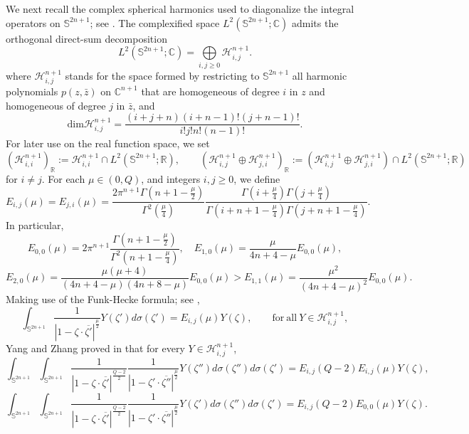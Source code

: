 \documentclass[10pt,a4paper]{amsart}
\begin{document}
{We next recall the complex spherical harmonics used to diagonalize the integral operators on}
$\mathbb{S}^{2n+1}$; see \cite[Section 5.2]{FL12}. {The complexified space $L^2(\mathbb{S}^{2n+1};\mathbb C)$
 admits the orthogonal direct-sum decomposition}
\begin{equation*}
 {L^2(\mathbb{S}^{2n+1};\mathbb C)=\bigoplus\limits_{i,j\geq0}\mathcal{H}_{i,j}^{n+1}.}
\end{equation*}
where $\mathcal{H}_{i,j}^{n+1}$ stands for the space formed by restricting to $\mathbb{S}^{2n+1}$ all harmonic polynomials $p(z,\bar{z})$ on $\mathbb{C}^{n+1}$ that are
homogeneous of degree $i$ in $z$ and homogeneous of degree $j$ in $\bar{z}$, and
\begin{equation*}
 \mathrm{dim} \mathcal{H}_{i,j}^{n+1}=\frac{(i+j+n)(i+n-1)!(j+n-1)!}{i!j!n!(n-1)!}.
\end{equation*}
For later use on the real function space, we set
\[
 (\mathcal H_{i,i}^{n+1})_{\mathbb R}
 :=\mathcal H_{i,i}^{n+1}\cap L^2(\mathbb S^{2n+1};\mathbb R),
 \qquad
 (\mathcal H_{i,j}^{n+1}\oplus\mathcal H_{j,i}^{n+1})_{\mathbb R}
 :=(\mathcal H_{i,j}^{n+1}\oplus\mathcal H_{j,i}^{n+1})
 \cap L^2(\mathbb S^{2n+1};\mathbb R)
\]
for $i\ne j$.
For each $\mu\in (0,Q)$, and integers $i,j\geq0$, we define
\begin{equation*}
 E_{i,j}(\mu)=E_{j,i}(\mu)=\frac{2\pi^{n+1}\Gamma(n+1-\frac{\mu}{2})}{\Gamma^2(\frac{\mu}{4})}
 \frac{\Gamma(i+\frac{\mu}{4})\Gamma(j+\frac{\mu}{4})}{\Gamma(i+n+1-\frac{\mu}{4})\Gamma(j+n+1-\frac{\mu}{4})}.
\end{equation*}
In particular,
\begin{equation*}
 E_{0,0}(\mu)=2\pi^{n+1}\frac{\Gamma(n+1-\frac{\mu}{2})}{\Gamma^2(n+1-\frac{\mu}{4})},\quad E_{1,0}(\mu)=\frac{\mu}{4n+4-\mu}E_{0,0}(\mu),
\end{equation*}
\begin{equation*}
 E_{2,0}(\mu)=\frac{\mu(\mu+4)}{(4n+4-\mu)(4n+8-\mu)}E_{0,0}(\mu)>
 E_{1,1}(\mu)=\frac{\mu^2}{(4n+4-\mu)^2}E_{0,0}(\mu).
\end{equation*}
Making use of the Funk-Hecke formula; see \cite[Corollary 5.3]{FL12},
\begin{equation*}
 \int_{\mathbb{S}^{2n+1}}\frac{1}{|1-\zeta\cdot \overline{\zeta'}|^{\frac{\mu}{2}}}Y(\zeta')d \sigma(\zeta')=E_{i,j}(\mu) Y(\zeta),\qquad \mathrm{for~all}~Y \in \mathcal{H}_{i,j}^{n+1},
\end{equation*}
Yang and Zhang proved in \cite[Lemma 2.3]{YZ251} that for every $Y \in \mathcal{H}_{i,j}^{n+1}$,
\begin{equation}\label{FHA}
 \int_{\mathbb{S}^{2n+1}}\int_{\mathbb{S}^{2n+1}}\frac{1}{|1-\zeta\cdot \overline{\zeta'}|^{\frac{Q-2}{2}}}\frac{1}{|1-\zeta'\cdot \overline{\zeta''}|^{\frac{\mu}{2}}}Y(\zeta'')d \sigma( \zeta'')d \sigma(\zeta')=E_{i,j}(Q-2)E_{i,j}(\mu) Y(\zeta),
\end{equation}
\begin{equation*}
 \int_{\mathbb{S}^{2n+1}}\int_{\mathbb{S}^{2n+1}}\frac{1}{|1-\zeta\cdot \overline{\zeta'}|^{\frac{Q-2}{2}}}\frac{1}{|1-\zeta'\cdot \overline{\zeta''}|^{\frac{\mu}{2}}}Y(\zeta')d \sigma(\zeta'')d \sigma(\zeta')=E_{i,j}(Q-2)E_{0,0}(\mu) Y(\zeta).
\end{equation*}
\end{document}
